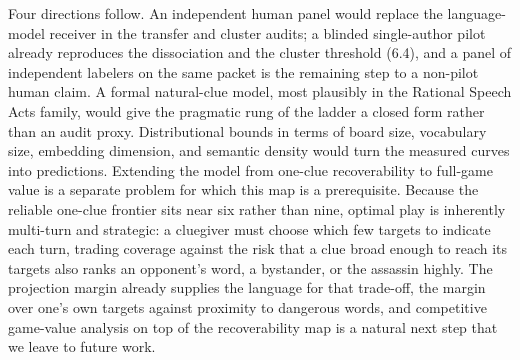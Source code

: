\documentclass[11pt]{article}
\begin{document}
Four directions follow. An independent human panel would replace the
language-model receiver in the transfer and cluster audits; a blinded
single-author pilot already reproduces the dissociation and the cluster threshold
(6.4), and a panel of independent labelers on the same packet is the remaining
step to a non-pilot human claim. A formal natural-clue model, most plausibly in
the Rational Speech Acts family, would give the pragmatic rung of the ladder a
closed form rather than an audit proxy. Distributional bounds in terms of board
size, vocabulary size, embedding dimension, and semantic density would turn the
measured curves into predictions. Extending the model from one-clue recoverability
to full-game value is a separate problem for which this map is a prerequisite.
Because the reliable one-clue frontier sits near six rather than nine, optimal
play is inherently multi-turn and strategic: a cluegiver must choose which few
targets to indicate each turn, trading coverage against the risk that a clue broad
enough to reach its targets also ranks an opponent's word, a bystander, or the
assassin highly. The projection margin already supplies the language for that
trade-off, the margin over one's own targets against proximity to dangerous words,
and competitive game-value analysis on top of the recoverability map is a natural
next step that we leave to future work.



\end{document}
